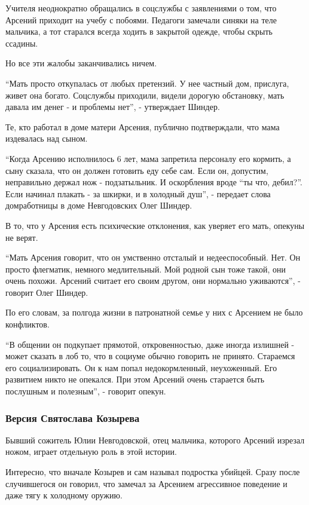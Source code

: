 Учителя неоднократно обращались в соцслужбы с заявлениями о том, что Арсений приходит на учебу с побоями. Педагоги замечали синяки на теле мальчика, а тот старался всегда ходить в закрытой одежде, чтобы скрыть ссадины.

Но все эти жалобы заканчивались ничем. 

“Мать просто откупалась от любых претензий. У нее частный дом, прислуга, живет
она богато. Соцслужбы приходили, видели дорогую обстановку, мать давала им
денег - и проблемы нет”, - утверждает Шиндер.

Те, кто работал в доме матери Арсения, публично подтверждали, что мама
издевалась над сыном.

“Когда Арсению исполнилось 6 лет, мама запретила персоналу его кормить, а сыну
сказала, что он должен готовить еду себе сам. Если он, допустим, неправильно
держал нож - подзатыльник. И оскорбления вроде “ты что, дебил?”. Если начинал
плакать - за шкирки, и в холодный душ”, - передает слова домработницы в доме
Невгодовских Олег Шиндер. 

В то, что у Арсения есть психические отклонения, как уверяет его мать, опекуны
не верят.

“Мать Арсения говорит, что он умственно отсталый и недееспособный. Нет. Он
просто флегматик, немного медлительный. Мой родной сын тоже такой, они очень
похожи. Арсений считает его своим другом, они нормально уживаются”, - говорит
Олег Шиндер. 

По его словам, за полгода жизни в патронатной семье у них с Арсением не было
конфликтов. 

“В общении он подкупает прямотой, откровенностью, даже иногда излишней - может
сказать в лоб то, что в социуме обычно говорить не принято. Стараемся его
социализировать. Он к нам попал недокормленный, неухоженный. Его развитием
никто не опекался. При этом Арсений очень старается быть послушным и полезным”,
- говорит опекун. 

\subsubsection{Версия Святослава Козырева}

Бывший сожитель Юлии Невгодовской, отец мальчика, которого Арсений изрезал
ножом, играет отдельную роль в этой истории.

Интересно, что вначале Козырев и сам называл подростка убийцей. Сразу после
случившегося он говорил, что замечал за Арсением агрессивное поведение и даже
тягу к холодному оружию.

